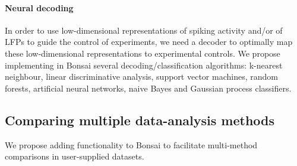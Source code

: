 \paragraph{Neural decoding}
\label{sec:neuralDecoding}

In order to use low-dimensional representations of spiking activity and/or of
LFPs to guide the control of experiments, we need a decoder to optimally map
these low-dimensional representations to experimental controls.
%
We propose implementing in Bonsai several decoding/classification algorithms:
k-nearest neighbour, linear discriminative analysis, support vector machines,
random forests, artificial neural networks, naive Bayes and Gaussian process
classifiers.

\subsection{Comparing multiple data-analysis methods}
\label{sec:comparisonOfMultipleMethods}

We propose adding functionality to Bonsai to facilitate multi-method
comparisons in user-supplied datasets.




